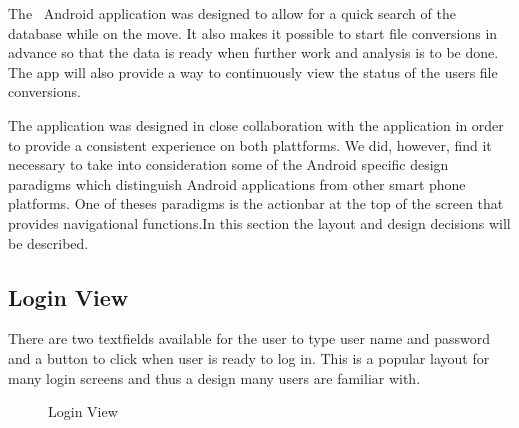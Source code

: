 


The \appName\ Android application was designed to allow for a quick search of the database while on the move. It also makes it possible to start file conversions in advance so that the data is ready when further work and analysis is to be done. The app will also provide a way to continuously view the status of the users file conversions. 

The application was designed in close collaboration with the  application in order to provide a consistent experience on both plattforms.  We did, however, find it necessary to take into consideration some of the Android specific design paradigms which distinguish Android applications from other smart phone platforms. One of theses paradigms is the actionbar at the top of the screen that provides navigational functions.In this section the layout and design decisions will be described.


\subsection{Login View}
There are two textfields available for the user to type user name and password and a button to click when user is ready to log in. This is a popular layout for many login screens and thus a design many users are familiar with.


\begin{figure}[ht]
\caption{Login View}
\label{fig:and_login}
\end{figure}
\FloatBarrier

